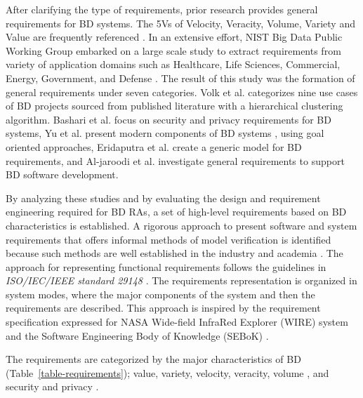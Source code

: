 \documentclass[conference]{IEEEtran}
\begin{document}
After clarifying the type of requirements, prior research provides general requirements for BD systems. The 5Vs of Velocity, Veracity, Volume, Variety and Value are frequently referenced \cite{Bahrami2015,rad2017big,Chen2016a}. In an extensive effort, NIST Big Data Public Working Group embarked on a large scale study to extract requirements from variety of application domains such as Healthcare, Life Sciences, Commercial, Energy, Government, and Defense \cite{Chang}. The result of this study was the formation of general requirements under seven categories. Volk et al. \cite{volk2020identifying} categorizes nine use cases of BD projects sourced from published literature with a hierarchical clustering algorithm. Bashari et al. \cite{bashari2016security} focus on security and privacy requirements for BD systems, Yu et al. present modern components of BD systems \cite{yu2019components}, using goal oriented approaches, Eridaputra et al. \cite{eridaputra2014modeling} create a generic model for BD requirements, and Al-jaroodi et al. \cite{al2016characteristics} investigate general requirements to support BD software development. 



By analyzing these studies and by evaluating the design and requirement engineering required for BD RAs, a set of high-level requirements based on BD characteristics is established. A rigorous approach to present software and system requirements that offers informal methods of model verification is identified because such methods are well established in the industry and academia \cite{kassab2014state}.  The approach for representing functional requirements follows the guidelines in \emph{ISO/IEC/IEEE standard 29148} \cite{ISO29148}. The requirements representation is organized in system modes, where the major components of the system and then the requirements are described. This approach is inspired by the requirement specification expressed for NASA Wide-field InfraRed Explorer (WIRE) system \cite{laplante2017requirements} and the Software Engineering Body of Knowledge (SEBoK) \cite{abran2004software}.

The requirements are categorized by the major characteristics of BD (Table~\ref{table-requirements}); value, variety, velocity, veracity, volume \cite{rada2017hype}, and security and privacy \cite{bashari2016security}. 
\end{document}
